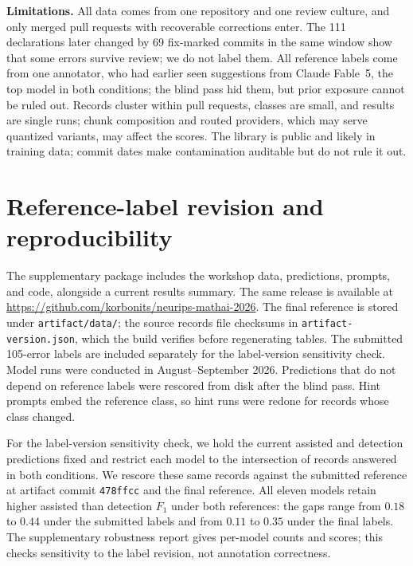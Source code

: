 \documentclass{article}
\begin{document}
\textbf{Limitations.} All data comes from one repository and one review
culture, and only merged pull requests with recoverable corrections enter.
The 111 declarations later changed by 69 fix-marked commits in the same
window show that some errors survive review; we do not label them. All
reference labels come from one annotator, who had earlier seen suggestions
from Claude Fable~5, the top model in both conditions; the blind pass hid
them, but prior exposure cannot be ruled out. Records cluster within pull requests, classes are
small, and results are single runs; chunk composition and routed providers,
which may serve quantized variants, may affect the scores. The library is
public and likely in training data; commit dates make contamination
auditable but do not rule it out.

\clearpage
\setlength{\bibhang}{1.6em}


\clearpage
\appendix
\section{Reference-label revision and reproducibility}
\label{sec:labels}
The supplementary package includes the workshop data, predictions, prompts,
and code, alongside a current results summary. The same release is available at
\url{https://github.com/korbonits/neurips-mathai-2026}.
The final reference is stored under \texttt{artifact/data/}; the source records
file checksums in \texttt{artifact-version.json}, which the build verifies before
regenerating tables. The submitted 105-error labels are included separately
for the label-version sensitivity check.
Model runs were conducted in August--September 2026. Predictions that do not depend on reference labels were rescored
from disk after the blind pass. Hint prompts embed the reference class, so
hint runs were redone for records whose class changed.

For the label-version sensitivity check, we hold the current assisted and
detection predictions fixed and restrict each model to the intersection of
records answered in both conditions. We rescore these same records against
the submitted reference at artifact commit \texttt{478ffcc} and the final
reference. All eleven models retain higher assisted than detection $F_1$
under both references: the gaps range from $0.18$ to $0.44$ under the submitted
labels and from $0.11$ to $0.35$ under the final labels. The supplementary
robustness report gives per-model counts and scores; this checks sensitivity
to the label revision, not annotation correctness.
\end{document}
